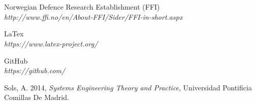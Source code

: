 \section *  {}

\begin{thebibliography}{9}


             Norwegian Defence Research Establishment (FFI) \\ 
\textit{http://www.ffi.no/en/About-FFI/Sider/FFI-in-short.aspx}

             LaTex \\ 
\textit{https://www.latex-project.org/}

             GitHub \\ 
\textit{https://github.com/}


Sols, A. 2014,      %
\textit{Systems Engineering Theory and Practice},   %
Universidad Pontificia Comillas De Madrid.          %




\end{thebibliography}






